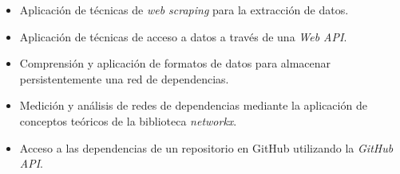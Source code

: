 \begin{itemize}
  \item Aplicación de técnicas de \textit{web scraping} para la extracción de datos.
  
  \item Aplicación de técnicas de acceso a datos a través de una \textit{Web API}.
  
  \item Comprensión y aplicación de formatos de datos para almacenar persistentemente una red de dependencias.
  
  \item Medición y análisis de redes de dependencias mediante la aplicación de conceptos teóricos de la biblioteca \textit{networkx}.
  
  \item Acceso a las dependencias de un repositorio en GitHub utilizando la \textit{GitHub API}.
\end{itemize}